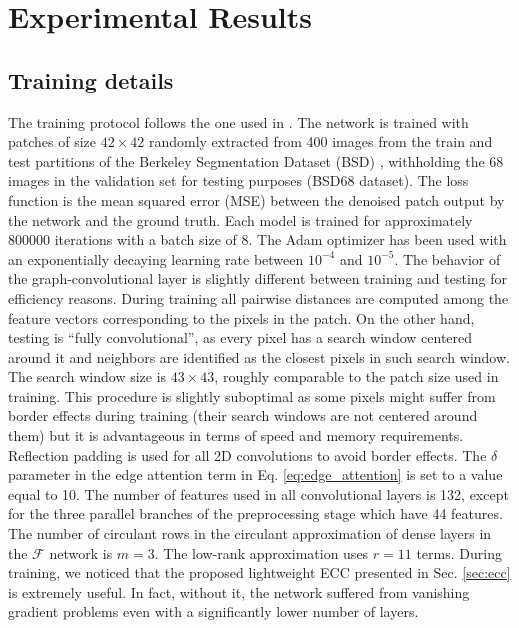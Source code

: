 \documentclass[journal]{IEEEtran}
\newcommand{\fun}{\mathcal{F}}
\begin{document}
\section{Experimental Results} \label{sec:experiments}

\subsection{Training details}
The training protocol follows the one used in \cite{zhang2017beyond}. The network is trained with patches of size $42 \times 42$ randomly extracted from 400 images from the train and test partitions of the Berkeley Segmentation Dataset (BSD) \cite{MartinFTM01}, withholding the 68 images in the validation set for testing purposes (BSD68 dataset). The loss function is the mean squared error (MSE) between the denoised patch output by the network and the ground truth. Each model is trained for approximately 800000 iterations with a batch size of 8. The Adam optimizer \cite{kingma2014adam} has been used with an exponentially decaying learning rate between $10^{-4}$ and $10^{-5}$. The behavior of the graph-convolutional layer is slightly different between training and testing for efficiency reasons. During training all pairwise distances are computed among the feature vectors corresponding to the pixels in the patch. On the other hand, testing is ``fully convolutional'', as every pixel has a search window centered around it and neighbors are identified as the closest pixels in such search window. The search window size is $43 \times 43$, roughly comparable to the patch size used in training. This procedure is slightly suboptimal as some pixels might suffer from border effects during training (their search windows are not centered around them) but it is advantageous in terms of speed and memory requirements. Reflection padding is used for all 2D convolutions to avoid border effects. The $\delta$ parameter in the edge attention term in Eq. \eqref{eq:edge_attention} is set to a value equal to 10. The number of features used in all convolutional layers is 132, except for the three parallel branches of the preprocessing stage which have 44 features. The number of
circulant rows in the circulant approximation of dense layers in the $\fun$ network is $m=3$. The low-rank approximation uses $r=11$ terms. During training, we noticed that the proposed lightweight ECC presented in Sec. \ref{sec:ecc} is extremely useful. In fact, without it, the network suffered from vanishing gradient problems even with a significantly lower number of layers.
\end{document}
